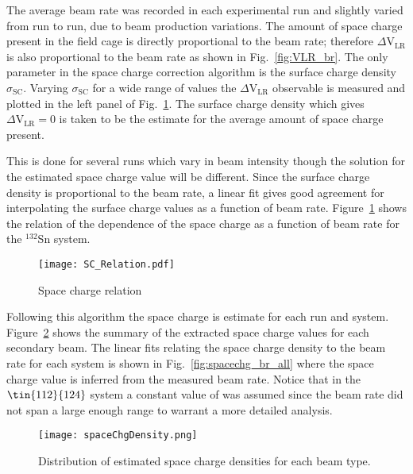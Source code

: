 The average beam rate was recorded in each experimental run and slightly varied from run to run, due to beam production variations. The amount of space charge present in the field cage is directly proportional to the beam rate; therefore $\Delta\mathrm{V}_\mathrm{LR}$ is also proportional to the beam rate as shown in Fig.~\ref{fig:VLR_br}. The only parameter in the space charge correction algorithm is the surface charge density $\sigma_{\mathrm{SC}}$. Varying $\sigma_{\mathrm{SC}}$ for a wide range of values the $\Delta\mathrm{V}_\mathrm{LR}$ observable is measured and plotted in the left panel of Fig.~\ref{fig:spacechg_relation}. The surface charge density which gives $\Delta\mathrm{V}_\mathrm{LR} = 0$ is taken to be the estimate for the average amount of space charge present. 

This is done for several runs which vary in beam intensity though the solution for the estimated space charge value will be different. Since the surface charge density is proportional to the beam rate, a linear fit gives good agreement for interpolating the surface charge values as a function of beam rate. Figure~\ref{fig:spacechg_relation} shows the relation of the dependence of the space charge as a function of beam rate for the ${}^{132}$Sn system.

\begin{figure}[!htb]
\texttt{[image: SC\_Relation.pdf]}
\caption{Space charge relation}
\label{fig:spacechg_relation}
\end{figure}


Following this algorithm the space charge is estimate for each run and system. Figure~\ref{fig:scDensity} shows the summary of the extracted space charge values for each secondary beam. The linear fits relating the space charge density to the beam rate for each system is shown in Fig.~\ref{fig:spacechg_br_all} where the space charge value is inferred from the measured beam rate. Notice that in the $\tin{112}{124}$ system a constant value of was assumed since the beam rate did not span a large enough range to warrant a more detailed analysis. 


\begin{figure}[!htb]
\texttt{[image: spaceChgDensity.png]}
\caption{Distribution of estimated space charge densities for each beam type.}
\label{fig:scDensity}
\end{figure}



